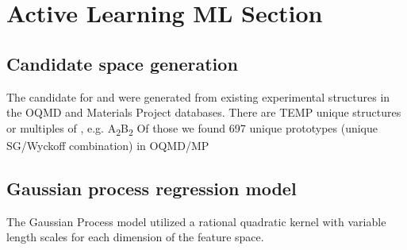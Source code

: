 

\section{Active Learning ML Section}  %
%

\subsection{Candidate space generation}
%
The candidate for \IrOtwo and \IrOthree were generated from existing experimental structures in the OQMD and Materials Project databases.
There are TEMP unique \ABtwo structures or multiples of \ABtwo,
e.g. A\textsubscript{2}B\textsubscript{2}
%
Of those we found 697 unique \ABtwo prototypes (unique SG/Wyckoff combination) in OQMD/MP


\subsection{Gaussian process regression model}

The Gaussian Process model utilized a rational quadratic kernel with variable length scales for each dimension of the feature space.

